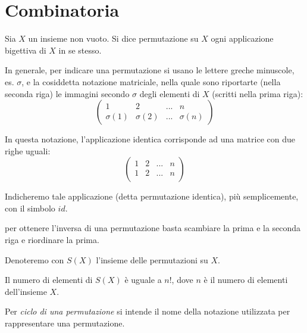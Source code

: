 \section{Combinatoria}

\begin{definizione}
Sia $X$ un insieme non vuoto. Si dice permutazione su $X$ ogni applicazione bigettiva di $X$ in se stesso.
\end{definizione}

In generale, per indicare una permutazione si usano le lettere greche minuscole, es. $\sigma$, e la cosiddetta notazione matriciale,
nella quale sono riportarte (nella seconda riga) le immagini secondo $\sigma$ degli elementi di $X$ (scritti nella prima riga):
\[
\left(
 \begin{array}{cccc}
  1 & 2 & ... & n \\
  \sigma(1) & \sigma(2) & ... & \sigma(n)
 \end{array}
\right)
\] 

\begin{definizione}
In questa notazione, l'applicazione identica corrisponde ad una matrice con due righe uguali:
\[
\left(
 \begin{array}{cccc}
  1 & 2 & ... & n \\
  1 & 2 & ... & n \\
 \end{array}
\right)
\]
\end{definizione}

Indicheremo tale applicazione (detta permutazione identica), più semplicemente, con il simbolo $id$. 

\begin{definizione}
per ottenere l’inversa di una permutazione basta scambiare la prima e la seconda riga e riordinare la prima. 
\end{definizione}

\begin{definizione}
Denoteremo con $S(X)$ l'insieme delle permutazioni su $X$. 
\end{definizione}

Il numero di elementi di $S(X)$ è uguale a $n!$, dove $n$ è il numero di elementi dell'insieme $X$.

\begin{definizione}
Per \textit{ciclo di una permutazione} si intende il nome della notazione utilizzata per rappresentare una permutazione.
\end{definizione}


